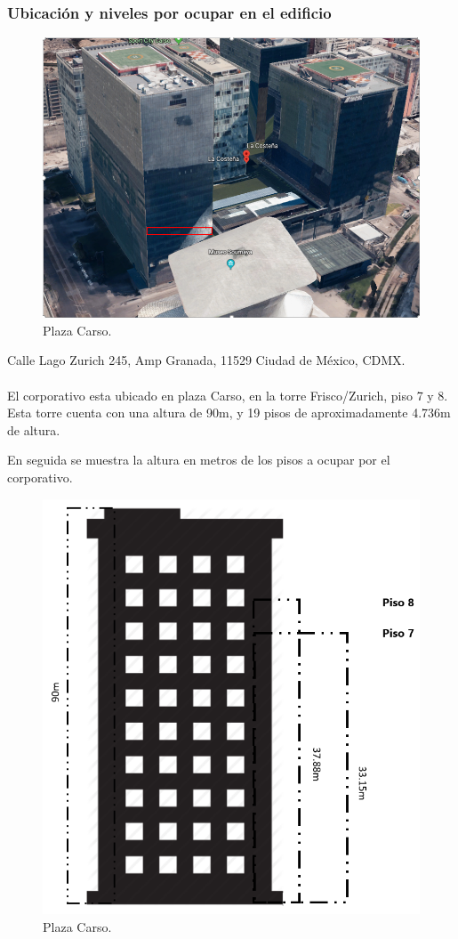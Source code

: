 \documentclass[12pt,letterpaper]{article}
\begin{document}
\newpage
\subsubsection{Ubicación y niveles por ocupar en el edificio}
\begin{figure}[ht]
    \centering
    \includegraphics[width=1\textwidth]{imagenes/edificios.png}
    \caption{Plaza Carso.}
\end{figure}
Calle Lago Zurich 245, Amp Granada, 11529 Ciudad de México, CDMX. 
\\ \\
El corporativo esta 
ubicado en plaza Carso, en la torre Frisco/Zurich, piso 7 y 8. Esta 
torre cuenta con una altura de 90m, y 19 pisos de aproximadamente 4.736m de altura.

\newpage
En seguida se muestra la altura en metros de los pisos a ocupar por el corporativo.
\begin{figure}[ht]
    \centering
    \includegraphics[width=.8\textwidth]{imagenes/torre.png}
    \caption{Plaza Carso.}
\end{figure}
\end{document}
